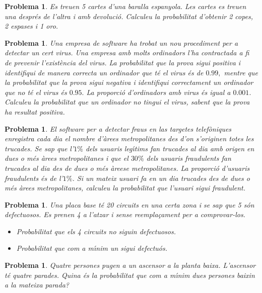 \documentclass[11pt]{article}
\newcounter{prbcont}
\newtheorem{problema}[prbcont]{Problema}
\begin{document}
\begin{problema}
Es treuen 5 cartes d'una baralla espanyola. Les cartes es treuen una despr\'es de l'altra i amb devoluci\'o. Calculeu la probabilitat d'obtenir 2 copes, 2 espases i 1 oro. %
\end{problema}

\begin{problema}
Una empresa de software ha trobat un nou procediment per a detectar un cert virus. Una empresa amb molts ordinadors l'ha contractada a fi de prevenir l'exist\`encia del virus. La probabilitat que la prova sigui positiva i identifiqui de manera correcta un ordinador que t\'e el virus \'es de $0.99,$ mentre que la probabilitat que la prova sigui negativa i identifiqui correctament un ordinador que no t\'e el virus \'es $0.95.$ La proporci\'o d'ordinadors amb virus \'es igual a $0.001.$ Calculeu la probabilitat que un ordinador no tingui el virus, sabent que la prova ha resultat positiva.
\end{problema}

\begin{problema}
El software per a detectar fraus en las targetes telef\`oniques enregistra cada dia el nombre d'\`arees metropolitanes des d'on s'originen totes les trucades. Se sap que l'$1\% $ dels usuaris leg\'{\i}tims fan trucades al dia amb origen en dues o m\'es \`arees metropolitanes i que el $30\%$ dels usuaris fraudulents fan trucades al dia des de dues o m\'es \`areese metropolitanes. La proporci\'o d'usuaris fraudulents \'es de l'$1\%$. Si un mateix usuari fa en un dia trucades des de dues o m\'es \`arees metropolitanes, calculeu la probabilitat que l'usuari sigui fraudulent.
\end{problema}

\begin{problema} 
Una placa base t\'e 20 circuits en una certa zona i se sap que 5 s\'on defectuosos. Es prenen 4 a l'atzar i sense reempla\c{c}ament per a comprovar-los. 
\begin{itemize}
\item [(a)] Probabilitat que els 4 circuits no siguin defectuosos.
\item [(b)] Probabilitat que com a m\'{\i}nim un sigui defectu\'os.
\end{itemize}
\end{problema}

\begin{problema}
Quatre persones pugen a un ascensor a la planta baixa. L'ascensor t\'e quatre parades. Quina \'es la probabilitat que com a m\'{\i}nim dues persones baixin a la mateixa parada?
\end{problema}
\end{document}
